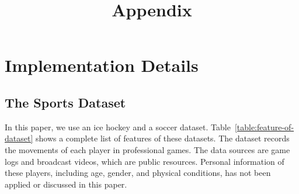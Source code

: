\documentclass{article}
\title{Appendix}
\author{
}
\begin{document}
\maketitle

\appendix

\section{Implementation Details}
\renewcommand{\thetable}{A.\arabic{table}}
\renewcommand\thefigure{\thesection.\arabic{figure}}
\setcounter{table}{0}
\subsection{The Sports Dataset}

In this paper, we use an ice hockey and a soccer dataset. Table~\ref{table:feature-of-dataset} shows a complete list of features of these datasets. The dataset records the movements of each player in professional games. The data sources are game logs and broadcast videos, which are public resources. Personal information of these players, including age, gender, and physical conditions, has not been applied or discussed in this paper.
\end{document}
